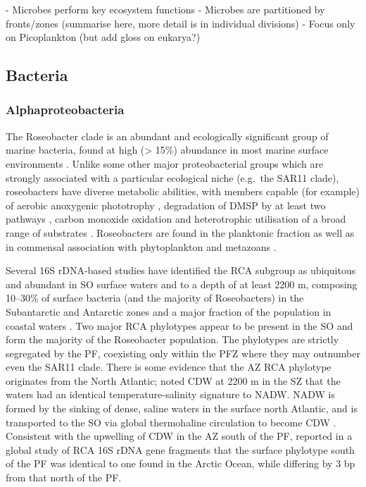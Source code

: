   - Microbes perform key ecosystem functions
  - Microbes are partitioned by fronts/zones (summarise here, more detail is in individual divisions)
  - Focus only on Picoplankton (but add gloss on eukarya?)

\subsection{Bacteria}

\subsubsection{Alphaproteobacteria}


The Roseobacter clade is an abundant and ecologically significant group of marine bacteria, found at high (> 15\%) abundance in most marine surface environments \citep[][and references therein]{Buchan:2005hd}.
Unlike some other major proteobacterial groups which are strongly associated with a particular ecological niche (e.g.\ the SAR11 clade), roseobacters have diverse metabolic abilities, with members capable (for example) of aerobic anoxygenic phototrophy \cite{Biebl:2005fp,Beja:2002gt}, degradation of \ac{DMSP} by at least two pathways \cite{Miller:2004jz,Moran:2003cwa}, carbon monoxide oxidation \cite{King:2003kc} and heterotrophic utilisation of a broad range of substrates \citep[reviewed in][]{Brinkhoff:2008do}.
Roseobacters are found in the planktonic fraction as well as in commensal association with phytoplankton and metazoans \citep[reviewed in][]{Buchan:2005hd}.

Several 16S rDNA-based studies have identified the \ac{RCA} subgroup as ubiquitous and abundant in \ac{SO} surface waters and to a depth of at least 2200 m, composing \textapprox{} 10--30\% of surface bacteria (and the majority of Roseobacters) in the Subantarctic and Antarctic zones \cite{Giebel:2009hr,Murray:2007db,Ghiglione:2011ee} and a major fraction of the population in coastal waters \cite{Murray:2007db,Koh:2011ij}.
Two major \ac{RCA} phylotypes appear to be present in the \ac{SO} and form the majority of the Roseobacter population.
The phylotypes are strictly segregated by the \ac{PF}, coexisting only within the \ac{PFZ} \cite{Selje:2004ka,Giebel:2009hr} where they may outnumber even the SAR11 clade.
There is some evidence that the \ac{AZ} \ac{RCA} phylotype originates from the North Atlantic; \citet{Giebel:2009hr} noted \ac{CDW} at 2200 m in the \ac{SZ} that the waters had an identical temperature-salinity signature to \ac{NADW}.
\ac{NADW} is formed by the sinking of dense, saline waters in the surface north Atlantic, and is transported to the \ac{SO} via global thermohaline circulation to become \ac{CDW} \cite{Callahan:1972tk}.
Consistent with the upwelling of \ac{CDW} in the \ac{AZ} south of the \ac{PF}, \citep{Selje:2004ka} reported in a global study of \ac{RCA} 16S rDNA gene fragments that the surface phylotype south of the \ac{PF} was identical to one found in the Arctic Ocean, while differing by 3 bp from that north of the \ac{PF}.

